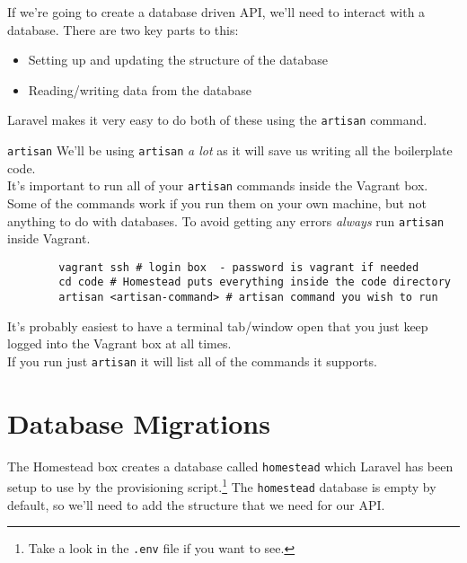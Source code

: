 If we're going to create a database driven API, we'll need to interact with a database. There are two key parts to this:

\begin{itemize}
    \item Setting up and updating the structure of the database
    \item Reading/writing data from the database
\end{itemize}

Laravel makes it very easy to do both of these using the \texttt{artisan} command.
\\

\begin{infobox}{\texttt{artisan}}
    We'll be using \texttt{artisan} \textit{a lot} as it will save us writing all the boilerplate code.
    \\

    It's important to run all of your \texttt{artisan} commands inside the Vagrant box. Some of the commands work if you run them on your own machine, but not anything to do with databases. To avoid getting any errors \textit{always} run \texttt{artisan} inside Vagrant.

    \begin{verbatim}
        vagrant ssh # login box  - password is vagrant if needed
        cd code # Homestead puts everything inside the code directory
        artisan <artisan-command> # artisan command you wish to run
    \end{verbatim}

    It's probably easiest to have a terminal tab/window open that you just keep logged into the Vagrant box at all times.
    \\

    If you run just \texttt{artisan} it will list all of the commands it supports.
\end{infobox}



\section{Database Migrations}

The Homestead box creates a database called \texttt{homestead} which Laravel has been setup to use by the provisioning script.\footnote{Take a look in the \texttt{.env} file if you want to see.} The \texttt{homestead} database is empty by default, so we'll need to add the structure that we need for our API.
\\

